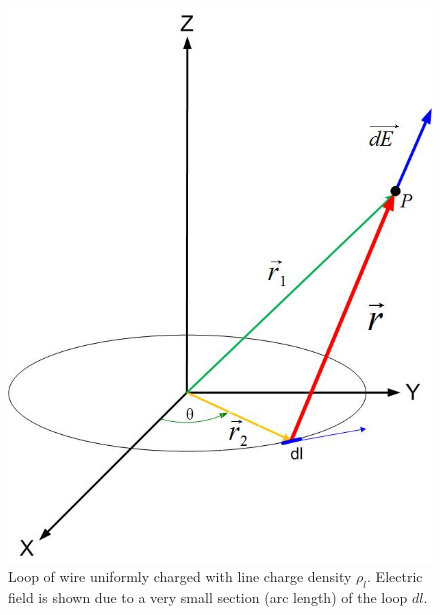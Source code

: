 \documentclass{ximera}
\begin{document}
\begin{figure}[!ht]
\begin{center}
\includegraphics[scale=0.5]{../jpg/Charge_Distributionanypoint.jpg}
\caption{\label{fig:loopSinglePt}Loop of wire uniformly charged with line charge density $\rho_l$. Electric field is shown due to a very small section (arc length) of the loop $dl$.}
\end{center}
\end{figure}
\end{document}
